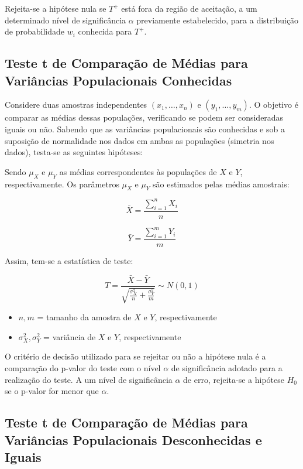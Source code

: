 \documentclass[
]{estat/estat}
\providecommand{\tightlist}{%
  \setlength{\itemsep}{0pt}\setlength{\parskip}{0pt}}\usepackage{longtable,booktabs,array}
\begin{document}
Rejeita-se a hipótese nula se \(T^+\) está fora da região de aceitação,
a um determinado nível de significância \(\alpha\) previamente
estabelecido, para a distribuição de probabilidade \(w_i\) conhecida
para \(T^+\).

\subsection{Teste t de Comparação de Médias para Variâncias
Populacionais
Conhecidas}\label{teste-t-de-comparauxe7uxe3o-de-muxe9dias-para-variuxe2ncias-populacionais-conhecidas}

Considere duas amostras independentes \((x_1, \ldots, x_n)\) e
\((y_1, \ldots, y_m)\). O objetivo é comparar as médias dessas
populações, verificando se podem ser consideradas iguais ou não. Sabendo
que as variâncias populacionais são conhecidas e sob a suposição de
normalidade nos dados em ambas as populações (simetria nos dados),
testa-se as seguintes hipóteses:


Sendo \(\mu_X\) e \(\mu_Y\) as médias correspondentes às populações de
\(X\) e \(Y\), respectivamente. Os parâmetros \(\mu_X\) e \(\mu_Y\) são
estimados pelas médias amostrais:

\[
\bar{X} = \frac{\sum_{i=1}^{n} X_i}{n}
\]

\[
\bar{Y} = \frac{\sum_{i=1}^{m} Y_i}{m}
\]

Assim, tem-se a estatística de teste:

\[
T = \frac{\bar{X} - \bar{Y}}{\sqrt{\frac{\sigma^2_{X}}{n} + \frac{\sigma^2_{Y}}{m}}} \sim N(0,1)
\]

\begin{itemize}
\tightlist
\item
  \(n, m\) = tamanho da amostra de \(X\) e \(Y\), respectivamente
\item
  \(\sigma_X^2, \sigma_Y^2\) = variância de \(X\) e \(Y\),
  respectivamente
\end{itemize}

O critério de decisão utilizado para se rejeitar ou não a hipótese nula
é a comparação do p-valor do teste com o nível \(\alpha\) de
significância adotado para a realização do teste. A um nível de
significância \(\alpha\) de erro, rejeita-se a hipótese \(H_{0}\) se o
p-valor for menor que \(\alpha\).

\subsection{Teste t de Comparação de Médias para Variâncias
Populacionais Desconhecidas e
Iguais}\label{teste-t-de-comparauxe7uxe3o-de-muxe9dias-para-variuxe2ncias-populacionais-desconhecidas-e-iguais}
\end{document}
